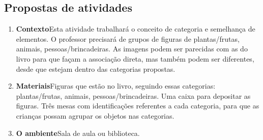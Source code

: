 \documentclass[11pt]{extarticle}
\begin{document}
\subsection{Propostas de atividades}


\begin{enumerate}
\item \textbf{Contexto}\quad Esta atividade trabalhará o conceito de categoria e semelhança de elementos. O professor precisará de grupos de figuras de  plantas/frutas, animais, pessoas/brincadeiras. As imagens podem ser parecidas com as do livro para que façam a associação direta, mas também podem ser diferentes, desde que estejam dentro das categorias propostas. 

\item \textbf{Materiais}\quad Figuras que estão no livro, seguindo essas categorias: plantas/frutas, animais, pessoas/brincadeiras. Uma caixa para depositar as figuras. Três mesas com identificações referentes a cada categoria, para que as crianças possam agrupar os objetos nas categorias. 


\item \textbf{O ambiente}\quad Sala de aula ou biblioteca. 





\end{enumerate}
\end{document}
